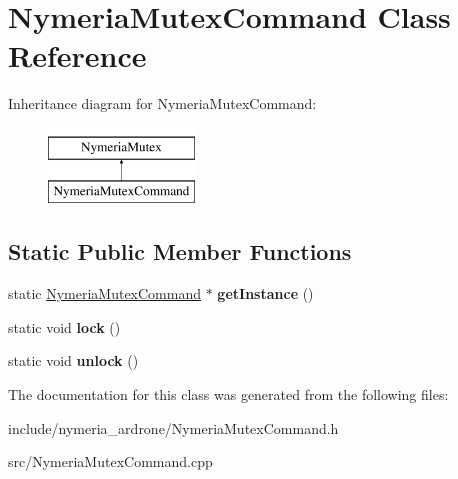 \hypertarget{classNymeriaMutexCommand}{\section{\-Nymeria\-Mutex\-Command \-Class \-Reference}
\label{classNymeriaMutexCommand}
}
\-Inheritance diagram for \-Nymeria\-Mutex\-Command\-:\begin{figure}[H]
\begin{center}
\leavevmode
\includegraphics[height=2.000000cm]{classNymeriaMutexCommand}
\end{center}
\end{figure}
\subsection*{\-Static \-Public \-Member \-Functions}
\begin{DoxyCompactItemize}
\item 
\hypertarget{classNymeriaMutexCommand_a3aef40b73394ef9c59c30df348ad760c}{static \hyperlink{classNymeriaMutexCommand}{\-Nymeria\-Mutex\-Command} $\ast$ {\bfseries get\-Instance} ()}\label{classNymeriaMutexCommand_a3aef40b73394ef9c59c30df348ad760c}

\item 
\hypertarget{classNymeriaMutexCommand_a48016d42ec51705f59c774aa2dc19796}{static void {\bfseries lock} ()}\label{classNymeriaMutexCommand_a48016d42ec51705f59c774aa2dc19796}

\item 
\hypertarget{classNymeriaMutexCommand_afea66e700a433145efeafd9b8a53df7b}{static void {\bfseries unlock} ()}\label{classNymeriaMutexCommand_afea66e700a433145efeafd9b8a53df7b}

\end{DoxyCompactItemize}


\-The documentation for this class was generated from the following files\-:\begin{DoxyCompactItemize}
\item 
include/nymeria\-\_\-ardrone/\-Nymeria\-Mutex\-Command.\-h\item 
src/\-Nymeria\-Mutex\-Command.\-cpp\end{DoxyCompactItemize}
